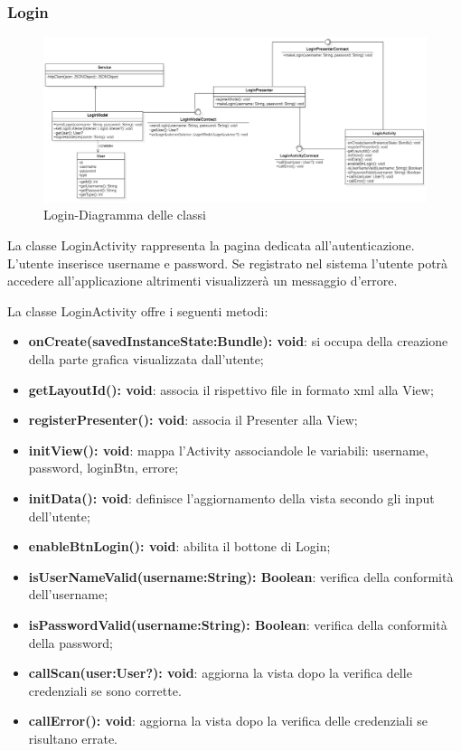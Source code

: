 \subsubsection{Login}
\begin{figure}[H]
	\centering
	\includegraphics[width=16cm]{res/images/loginClass.png}
	\caption{Login-Diagramma delle classi}
	\label{fig:Login-Diagramma delle classi}
\end{figure}
La classe LoginActivity rappresenta la pagina dedicata all'autenticazione. L'utente inserisce username e password. Se registrato nel sistema l'utente potrà accedere all'applicazione altrimenti visualizzerà un messaggio d'errore.

La classe LoginActivity offre i seguenti metodi:
\begin{itemize}
	\item \textbf{onCreate(savedInstanceState:Bundle): void}: si occupa della creazione della parte grafica visualizzata dall'utente; 
	\item \textbf{getLayoutId(): void}: associa il rispettivo file in formato xml alla View;
	\item \textbf{registerPresenter(): void}: associa il Presenter alla View;
	\item \textbf{initView(): void}: mappa l'Activity associandole le variabili: username, password, loginBtn, errore;
	\item \textbf{initData(): void}: definisce l'aggiornamento della vista secondo gli input dell'utente;
	\item \textbf{enableBtnLogin(): void}: abilita il bottone di Login;
	\item \textbf{isUserNameValid(username:String): Boolean}: verifica della conformità dell'username;
	\item \textbf{isPasswordValid(username:String): Boolean}: verifica della conformità della password;
	\item \textbf{callScan(user:User?): void}: aggiorna la vista dopo la verifica delle credenziali se sono corrette.
	\item \textbf{callError(): void}: aggiorna la vista dopo la verifica delle credenziali se risultano errate.
\end{itemize}


